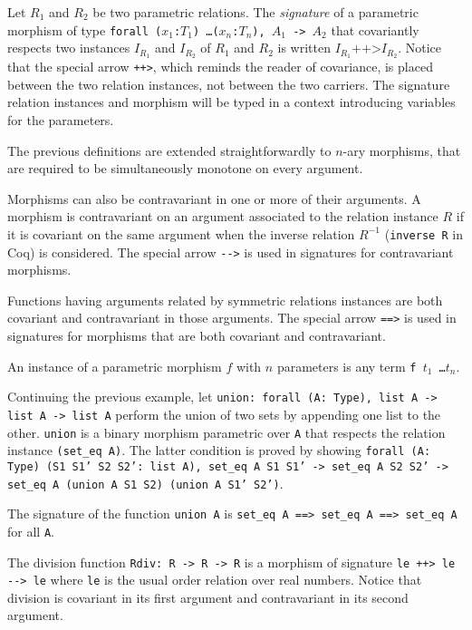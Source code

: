 Let $R_1$ and $R_2$ be two parametric relations.
The \emph{signature} of a parametric morphism of type
\texttt{forall ($x_1$:$T_1$) \ldots ($x_n$:$T_n$), $A_1$ -> $A_2$} that
covariantly respects two instances $I_{R_1}$ and $I_{R_2}$ of $R_1$ and $R_2$ is written $I_{R_1} \texttt{++>} I_{R_2}$.
Notice that the special arrow \texttt{++>}, which reminds the reader
of covariance, is placed between the two relation instances, not
between the two carriers. The signature relation instances and morphism will
be typed in a context introducing variables for the parameters.

The previous definitions are extended straightforwardly to $n$-ary morphisms,
that are required to be simultaneously monotone on every argument.

Morphisms can also be contravariant in one or more of their arguments.
A morphism is contravariant on an argument associated to the relation instance
$R$ if it is covariant on the same argument when the inverse relation
$R^{-1}$ (\texttt{inverse R} in Coq) is considered. 
The special arrow \texttt{-{}->} is used in signatures
for contravariant morphisms.

Functions having arguments related by symmetric relations instances are both
covariant and contravariant in those arguments. The special arrow
\texttt{==>} is used in signatures for morphisms that are both covariant
and contravariant.

An instance of a parametric morphism $f$ with $n$ parameters is any term
\texttt{f $t_1$ \ldots $t_n$}.

\begin{cscexample}[Morphisms]
Continuing the previous example, let
\texttt{union: forall (A: Type), list A -> list A -> list A} perform the union
of two sets by appending one list to the other. \texttt{union} is a binary
morphism parametric over \texttt{A} that respects the relation instance
\texttt{(set\_eq A)}. The latter condition is proved by showing
\texttt{forall (A: Type) (S1 S1' S2 S2': list A), set\_eq A S1 S1' ->
 set\_eq A S2 S2' -> set\_eq A (union A S1 S2) (union A S1' S2')}.

The signature of the function \texttt{union A} is
\texttt{set\_eq A ==> set\_eq A ==> set\_eq A} for all \texttt{A}.
\end{cscexample}

\begin{cscexample}
The division function \texttt{Rdiv: R -> R -> R} is a morphism of
signature \texttt{le ++> le -{}-> le} where \texttt{le} is
the usual order relation over real numbers. Notice that division is
covariant in its first argument and contravariant in its second
argument.
\end{cscexample}

